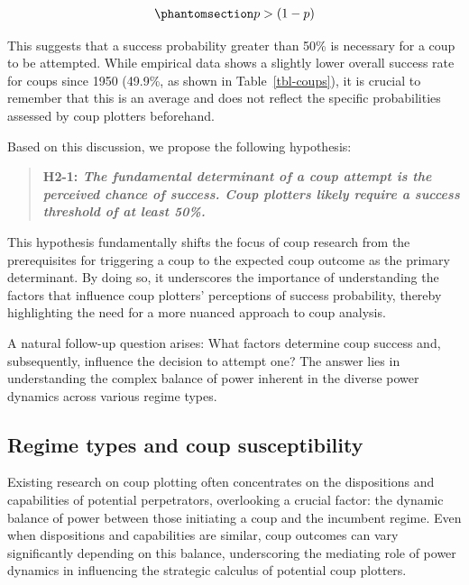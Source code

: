 \documentclass[
  12pt,
]{report}
\begin{document}
\begin{equation}\phantomsection\label{eq-eq3}{
\begin{aligned}
p > (1-p)
\end{aligned}
}\end{equation}

This suggests that a success probability greater than 50\% is necessary
for a coup to be attempted. While empirical data shows a slightly lower
overall success rate for coups since 1950 (49.9\%, as shown in
Table~\ref{tbl-coups}), it is crucial to remember that this is an
average and does not reflect the specific probabilities assessed by coup
plotters beforehand.

Based on this discussion, we propose the following hypothesis:

\begin{quote}
\textbf{H2-1: \emph{The fundamental determinant of a coup attempt is the
perceived chance of success. Coup plotters likely require a success
threshold of at least 50\%.}}
\end{quote}

This hypothesis fundamentally shifts the focus of coup research from the
prerequisites for triggering a coup to the expected coup outcome as the
primary determinant. By doing so, it underscores the importance of
understanding the factors that influence coup plotters' perceptions of
success probability, thereby highlighting the need for a more nuanced
approach to coup analysis.

A natural follow-up question arises: What factors determine coup success
and, subsequently, influence the decision to attempt one? The answer
lies in understanding the complex balance of power inherent in the
diverse power dynamics across various regime types.

\subsection{Regime types and coup
susceptibility}\label{regime-types-and-coup-susceptibility}

Existing research on coup plotting often concentrates on the
dispositions and capabilities of potential perpetrators, overlooking a
crucial factor: the dynamic balance of power between those initiating a
coup and the incumbent regime. Even when dispositions and capabilities
are similar, coup outcomes can vary significantly depending on this
balance, underscoring the mediating role of power dynamics in
influencing the strategic calculus of potential coup plotters.
\end{document}
